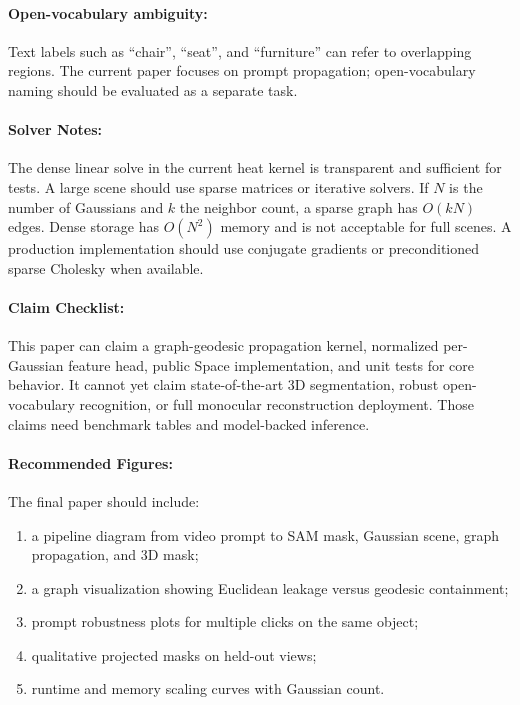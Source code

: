 \documentclass{article}
\begin{document}
\paragraph{Open-vocabulary ambiguity:}
Text labels such as ``chair'', ``seat'', and ``furniture'' can refer to overlapping regions. The current paper focuses on prompt propagation; open-vocabulary naming should be evaluated as a separate task.

\paragraph{Solver Notes:}

The dense linear solve in the current heat kernel is transparent and sufficient for tests. A large scene should use sparse matrices or iterative solvers. If $N$ is the number of Gaussians and $k$ the neighbor count, a sparse graph has $O(kN)$ edges. Dense storage has $O(N^2)$ memory and is not acceptable for full scenes. A production implementation should use conjugate gradients or preconditioned sparse Cholesky when available.

\paragraph{Claim Checklist:}

This paper can claim a graph-geodesic propagation kernel, normalized per-Gaussian feature head, public Space implementation, and unit tests for core behavior. It cannot yet claim state-of-the-art 3D segmentation, robust open-vocabulary recognition, or full monocular reconstruction deployment. Those claims need benchmark tables and model-backed inference.

\paragraph{Recommended Figures:}

The final paper should include:
\begin{enumerate}
  \item a pipeline diagram from video prompt to SAM mask, Gaussian scene, graph propagation, and 3D mask;
  \item a graph visualization showing Euclidean leakage versus geodesic containment;
  \item prompt robustness plots for multiple clicks on the same object;
  \item qualitative projected masks on held-out views;
  \item runtime and memory scaling curves with Gaussian count.
\end{enumerate}
\end{document}
